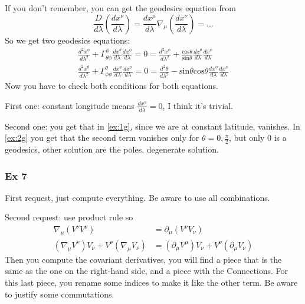 If you don't remember, you can get the geodesics equation from
\[
\frac{D}{d\lambda }\left( \frac{dx^{\nu }}{d\lambda } \right) = \frac{d x^{\mu }}{d \lambda }\nabla _{\mu }\left( \frac{d x^{\nu }}{d \lambda } \right) = \ldots 
\]
So we get two geodesics equations:
\begin{gather}
	\frac{d ^{2}x^{\phi }}{d \lambda ^{2}} + \Gamma ^{\phi }_{\theta \phi }\frac{d x^{\theta }}{d \lambda }\frac{d x^{\phi }}{d \lambda } =0  = \frac{d ^{2}x^{\phi }}{d \lambda ^{2}} + \frac{\text{cos}\theta }{\text{sin}\theta }\frac{d x^{\theta }}{d \lambda }\frac{d x^{\phi }}{d \lambda } \label{ex:1g}\\
	\frac{d^{2}x^{\theta }}{d\lambda ^{2}} + \Gamma ^{\theta }_{\phi \phi }\frac{d x^{\phi }}{d \lambda }\frac{d x^{\phi }}{d \lambda } = 0  = \frac{d ^{2}\theta }{d \lambda ^{2}} - \text{sin}\theta \text{cos}\theta \frac{d x^{\phi }}{d \lambda }\frac{d x^{\phi }}{d \lambda }\label{ex:2g}
\end{gather}
Now you have to check both conditions for both equations.\par
First one: constant longitude means $\frac{d x^{\phi }}{d \lambda } = 0$, I think it's trivial. \par
Second one: you get that in \ref{ex:1g}, since we are at constant latitude, vanishes. In \ref{ex:2g} you get that the second term vanishes only for $\theta =0 , \frac{\pi }{2}$, but only 0 is a geodesics, other solution are the poles, degenerate solution. 

\subsubsection{Ex 7}
First request, just compute everything. Be aware to use all combinations.\par
Second request: use product rule so
\begin{align*}
	\nabla _{\mu }\left( V^{\nu }V^{\nu } \right) &= \partial_{\mu }\left( V^{\nu }V_{\nu } \right)\\
	\left( \nabla _{\mu }V^{\nu } \right)V_{\nu } + V^{\nu }\left( \nabla _{\mu }V_{\nu } \right) &= \left( \partial_{\mu }V^{\mu } \right)V_{\nu } + V^{\nu }\left( \partial_{\mu }V_{\nu } \right)
\end{align*}
Then you compute the covariant derivatives, you will find a piece that is the same as the one on the right-hand side, and a piece with the Connections.
For this last piece, you rename some indices to make it like the other term. Be aware to justify some commutations. 

